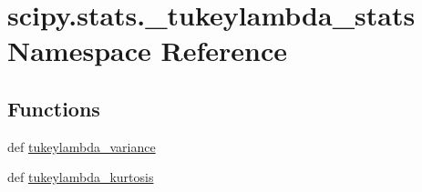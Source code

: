 \hypertarget{namespacescipy_1_1stats_1_1__tukeylambda__stats}{}\section{scipy.\+stats.\+\_\+tukeylambda\+\_\+stats Namespace Reference}
\label{namespacescipy_1_1stats_1_1__tukeylambda__stats}
\subsection*{Functions}
\begin{DoxyCompactItemize}
\item 
def \hyperlink{namespacescipy_1_1stats_1_1__tukeylambda__stats_a7f0c4e992d0993171c7e637fe245280c}{tukeylambda\+\_\+variance}
\item 
def \hyperlink{namespacescipy_1_1stats_1_1__tukeylambda__stats_a9f2c7eb01929288b76c504279ce275e3}{tukeylambda\+\_\+kurtosis}
\end{DoxyCompactItemize}
